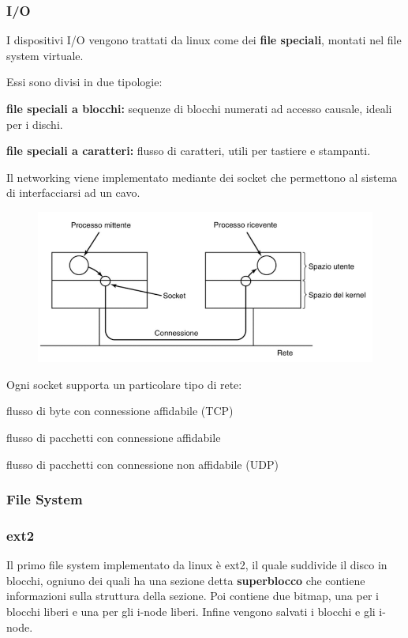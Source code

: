 \subsubsection{I/O}
I dispositivi I/O vengono trattati da linux come dei \textbf{file speciali}, montati nel file system virtuale.

\spacer
Essi sono divisi in due tipologie:
\begin{sitemize}
    \item \textbf{file speciali a blocchi:} sequenze di blocchi numerati ad accesso causale, ideali per i dischi.
    \item \textbf{file speciali a caratteri:} flusso di caratteri, utili per tastiere e stampanti.
\end{sitemize}

\spacer
Il networking viene implementato mediante dei socket che permettono al sistema di interfacciarsi ad un cavo.

\begin{figure}[H]
    \centering
    \includegraphics[width=0.5\linewidth]{assets/linux-socket.png}
\end{figure}

Ogni socket supporta un particolare tipo di rete:
\begin{sitemize}
    \item flusso di byte con connessione affidabile (TCP)
    \item flusso di pacchetti con connessione affidabile
    \item flusso di pacchetti con connessione non affidabile (UDP)
\end{sitemize}

\subsubsection{File System}

\subsubsection{ext2}
Il primo file system implementato da linux è ext2, il quale suddivide il disco in blocchi, ogniuno dei quali ha una sezione detta \textbf{superblocco} che contiene informazioni sulla struttura della sezione.
Poi contiene due bitmap, una per i blocchi liberi e una per gli i-node liberi.
Infine vengono salvati i blocchi e gli i-node.


